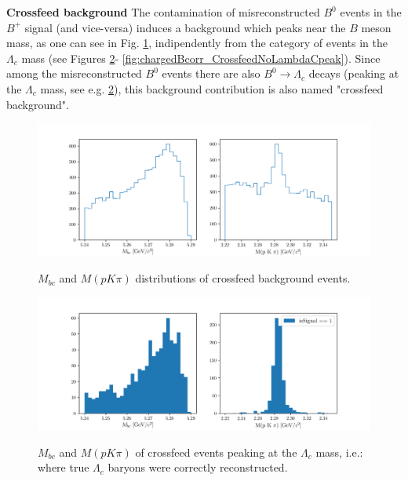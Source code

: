 \newpage

\noindent \textbf{Crossfeed background}
\newline
The contamination of misreconstructed $B^0$ events in the $B^+$ signal (and vice-versa) induces a background which peaks near the $B$ meson mass, as one can see in Fig. \ref{fig:chargedBcorr_Crossfeed}, indipendently from the category of events in the $\Lambda_c$ mass (see Figures \ref{fig:chargedBcorr_CrossfeedLambdaCpeak}- \ref{fig:chargedBcorr_CrossfeedNoLambdaCpeak}). 
Since among the misreconstructed $B^0$ events there are also $B^0 \rightarrow \Lambda_c $ decays (peaking at the $\Lambda_c$ mass, see e.g. \cref{fig:chargedBcorr_CrossfeedLambdaCpeak}), this background contribution is also named "crossfeed background". 

\begin{figure}[H]
\centering
{\includegraphics[width=1\textwidth]{04-chargedCorrBtoLambda/figs/chargedBcorr_Crossfeed.png}}
\caption{$M_{bc}$ and $M(p K \pi)$ distributions of crossfeed background events. }
\label{fig:chargedBcorr_Crossfeed}
\end{figure}

\begin{figure}[H]
\centering
{\includegraphics[width=1\textwidth]{04-chargedCorrBtoLambda/figs/chargedBcorr_CrossfeedLambdaCpeak.png}}
\caption{$M_{bc}$ and $M(p K \pi)$ of crossfeed events peaking at the $ \Lambda_c$ mass, i.e.: where true $ \Lambda_c$ baryons were correctly reconstructed. }
\label{fig:chargedBcorr_CrossfeedLambdaCpeak}
\end{figure}


